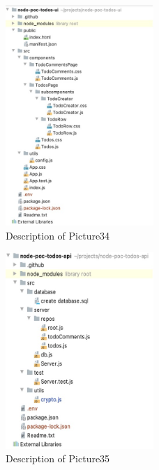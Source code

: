 \documentclass[runningheads]{llncs}
\begin{document}
\begin{figure}[h]
    \centering
    \includegraphics[width=0.5\textwidth]{Pictures/Picture34.jpg}
    \caption{Description of Picture34}
    \label{fig:picture34}
\end{figure}
\begin{figure}[h]
    \centering
    \includegraphics[width=0.5\textwidth]{Pictures/Picture35.jpg}
    \caption{Description of Picture35}
    \label{fig:picture35}
\end{figure}
\end{document}
